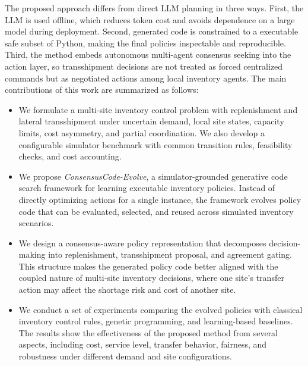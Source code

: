 \documentclass[journal]{IEEEtran}
\begin{document}
The proposed approach differs from direct LLM planning in three ways. First, the LLM is used offline, which reduces token cost and avoids dependence on a large model during deployment. Second, generated code is constrained to a executable safe subset of Python, making the final policies inspectable and reproducible. Third, the method embeds autonomous multi-agent consensus seeking into the action layer, so transshipment decisions are not treated as forced centralized commands but as negotiated actions among local inventory agents. The main contributions of this work are summarized as follows:
\begin{itemize}
	\item We formulate a multi-site inventory control problem with replenishment and lateral transshipment under uncertain demand, local site states, capacity limits, cost asymmetry, and partial coordination. We also develop a configurable simulator benchmark with common transition rules, feasibility checks, and cost accounting.
	
	\item We propose \textit{ConsensusCode-Evolve}, a simulator-grounded generative code search framework for learning executable inventory policies. Instead of directly optimizing actions for a single instance, the framework evolves policy code that can be evaluated, selected, and reused across simulated inventory scenarios.
	
	\item We design a consensus-aware policy representation that decomposes decision-making into replenishment, transshipment proposal, and agreement gating. This structure makes the generated policy code better aligned with the coupled nature of multi-site inventory decisions, where one site’s transfer action may affect the shortage risk and cost of another site.
	
	
	\item We conduct a set of experiments comparing the evolved policies with classical inventory control rules, genetic programming, and learning-based baselines. The results show the effectiveness of the proposed method from several aspects, including cost, service level, transfer behavior, fairness, and robustness under different demand and site configurations.
\end{itemize}
\end{document}

